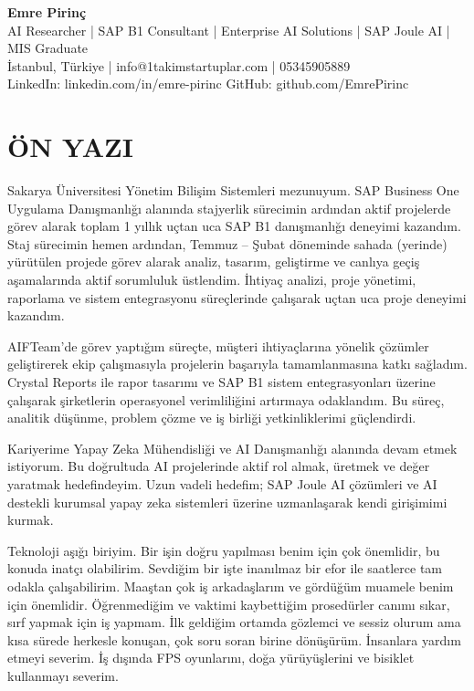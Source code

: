 \documentclass[a4paper,8pt]{article}
\begin{document}
\begin{center}
{\Large\bfseries Emre Pirinç}\\[2pt]
{\small AI Researcher | SAP B1 Consultant | Enterprise AI Solutions | SAP Joule AI | MIS Graduate}\\[2pt]
{\small İstanbul, Türkiye | info@1takimstartuplar.com | 05345905889}\\[1pt]
{\small LinkedIn: linkedin.com/in/emre-pirinc \textbar{} GitHub: github.com/EmrePirinc}
\end{center}

\vspace{-2pt}

\section{ÖN YAZI}
{\small Sakarya Üniversitesi Yönetim Bilişim Sistemleri mezunuyum. SAP Business One Uygulama Danışmanlığı alanında stajyerlik sürecimin ardından aktif projelerde görev alarak toplam 1 yıllık uçtan uca SAP B1 danışmanlığı deneyimi kazandım. Staj sürecimin hemen ardından, Temmuz – Şubat döneminde sahada (yerinde) yürütülen projede görev alarak analiz, tasarım, geliştirme ve canlıya geçiş aşamalarında aktif sorumluluk üstlendim. İhtiyaç analizi, proje yönetimi, raporlama ve sistem entegrasyonu süreçlerinde çalışarak uçtan uca proje deneyimi kazandım.

AIFTeam'de görev yaptığım süreçte, müşteri ihtiyaçlarına yönelik çözümler geliştirerek ekip çalışmasıyla projelerin başarıyla tamamlanmasına katkı sağladım. Crystal Reports ile rapor tasarımı ve SAP B1 sistem entegrasyonları üzerine çalışarak şirketlerin operasyonel verimliliğini artırmaya odaklandım. Bu süreç, analitik düşünme, problem çözme ve iş birliği yetkinliklerimi güçlendirdi.

Kariyerime Yapay Zeka Mühendisliği ve AI Danışmanlığı alanında devam etmek istiyorum. Bu doğrultuda AI projelerinde aktif rol almak, üretmek ve değer yaratmak hedefindeyim. Uzun vadeli hedefim; SAP Joule AI çözümleri ve AI destekli kurumsal yapay zeka sistemleri üzerine uzmanlaşarak kendi girişimimi kurmak.

Teknoloji aşığı biriyim. Bir işin doğru yapılması benim için çok önemlidir, bu konuda inatçı olabilirim. Sevdiğim bir işte inanılmaz bir efor ile saatlerce tam odakla çalışabilirim. Maaştan çok iş arkadaşlarım ve gördüğüm muamele benim için önemlidir. Öğrenmediğim ve vaktimi kaybettiğim prosedürler canımı sıkar, sırf yapmak için iş yapmam. İlk geldiğim ortamda gözlemci ve sessiz olurum ama kısa sürede herkesle konuşan, çok soru soran birine dönüşürüm. İnsanlara yardım etmeyi severim. İş dışında FPS oyunlarını, doğa yürüyüşlerini ve bisiklet kullanmayı severim.}
\end{document}
